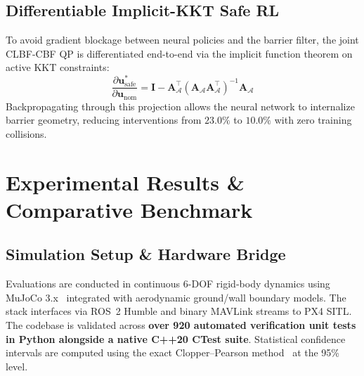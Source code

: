 \documentclass[journal,10pt]{IEEEtran}
\begin{document}
\subsection{Differentiable Implicit-KKT Safe RL}
To avoid gradient blockage between neural policies and the barrier filter, the joint CLBF-CBF QP is differentiated end-to-end via the implicit function theorem on active KKT constraints:
\begin{equation}
\frac{\partial \mathbf{u}^*_{\text{safe}}}{\partial \mathbf{u}_{\text{nom}}} = \mathbf{I} - \mathbf{A}_{\mathcal{A}}^\top (\mathbf{A}_{\mathcal{A}} \mathbf{A}_{\mathcal{A}}^\top)^{-1} \mathbf{A}_{\mathcal{A}}
\end{equation}
Backpropagating through this projection allows the neural network to internalize barrier geometry, reducing interventions from $23.0\%$ to $10.0\%$ with zero training collisions.

\section{Experimental Results \& Comparative Benchmark}
\label{sec:results}

\subsection{Simulation Setup \& Hardware Bridge}
Evaluations are conducted in continuous 6-DOF rigid-body dynamics using MuJoCo 3.x~\cite{todorov2012mujoco} integrated with aerodynamic ground/wall boundary models. The stack interfaces via ROS~2 Humble and binary MAVLink streams to PX4 SITL. The codebase is validated across \textbf{over 920 automated verification unit tests in Python alongside a native C++20 CTest suite}. Statistical confidence intervals are computed using the exact Clopper--Pearson method~\cite{clopper1934use} at the 95\% level.
\end{document}

